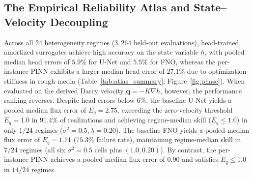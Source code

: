 \documentclass[preprint,12pt,authoryear]{elsarticle}
\begin{document}
\subsection{The Empirical Reliability Atlas and State--Velocity Decoupling}
\label{sec:atlas_results}

Across all 24 heterogeneity regimes ($3{,}264$ held-out evaluations), head-trained amortized surrogates achieve high accuracy on the state variable $h$, with pooled median head errors of $5.9\%$ for U-Net and $5.5\%$ for FNO, whereas the per-instance PINN exhibits a larger median head error of $27.1\%$ due to optimization stiffness in rough media (Table~\ref{tab:atlas_summary}; Figure~\ref{fig:phase}). When evaluated on the derived Darcy velocity $\mathbf{q} = -K\nabla h$, however, the performance ranking reverses. Despite head errors below $6\%$, the baseline U-Net yields a pooled median flux error of $E_q = 2.75$, exceeding the zero-velocity threshold $E_q = 1.0$ in $91.4\%$ of realizations and achieving regime-median skill ($E_q \le 1.0$) in only $1/24$ regimes ($\sigma^2 = 0.5, \lambda = 0.20$). The baseline FNO yields a pooled median flux error of $E_q = 1.71$ ($75.3\%$ failure rate), maintaining regime-median skill in $7/24$ regimes (all six $\sigma^2 = 0.5$ cells plus $(1.0, 0.20)$). By contrast, the per-instance PINN achieves a pooled median flux error of $0.90$ and satisfies $E_q \le 1.0$ in $14/24$ regimes.

\begin{table}[t!]
\centering
\caption{Atlas-wide performance summary across 24 lognormal heterogeneity regimes ($3{,}264$ held-out evaluations). Note on computational budget: U-Net and FNO are amortized surrogates trained once per regime ($95$--$110\text{ s}$) and evaluated in a single forward pass ($2.8\text{ ms/realization}$) across $64$ test instances/cell, whereas PINN is an instance-specific PDE optimizer ($10{,}500$ steps, $\sim 95\text{ s/realization}$) evaluated on $8$ stratified test instances/cell. Cell-cluster bootstrap 95\% confidence intervals ($1{,}000$ resamples) are reported for each family's governing pre-training ROC-AUC predictor.}
\label{tab:atlas_summary}
\end{table}
\end{document}
